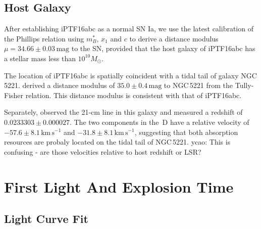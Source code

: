 \documentclass[twocolumn]{aastex61}
\newcommand{\sm}{M_\odot}
\newcommand{\ycao}[1]{{\color{red} ycao: {#1}}}
\begin{document}
\subsection{Host Galaxy}
\label{sec:host}

After establishing iPTF16abc as a normal SN Ia, we use the latest
calibration \citep{2014A&A...568A..22B} of the Phillips relation
\citep{1993ApJ...413L.105P} using $m^*_{B}$, $x_1$ and $c$ to derive a
distance modulus $\mu=34.66\pm0.03\,\textrm{mag}$ to the SN, provided
that the host galaxy of iPTF16abc has a stellar mass less than
$10^{10}\sm$.

The location of iPTF16abc is spatially coincident with a tidal tail of
galaxy NGC\,5221. \citet{2007A&A...465...71T} derived a distance
modulus of $35.0\pm0.4\,\textrm{mag}$ to NGC\,5221 from the Tully-Fisher
relation. This distance modulus is consistent with that of iPTF16abc.

Separately, \citet{1998A&AS..130..333T} observed the 21-cm line in
this galaxy and measured a redshift of $0.0233303\pm0.000027$.  The
two components in the \,D have a relative velocity of
$-57.6\pm8.1\,\textrm{km}\,\textrm{s}^{-1}$ and
$-31.8\pm8.1\,\textrm{km}\,\textrm{s}^{-1}$, suggesting that both
absorption resources are probaly located on the tidal tail of
NGC\,5221.\ycao{This is confusing - are those velocities relative to host redshift or LSR?}


\section{First Light And Explosion Time}
\label{sec:first_light}

\subsection{Light Curve Fit}
\label{sec:lc_fit}
\end{document}
